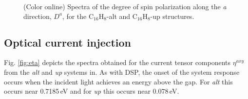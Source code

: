 \documentclass[pss]{wiley2sp} %
\begin{document}
\begin{figure}[t]
\hfill
{}
\caption{(Color online) Spectra of the degree of spin polarization along the
\emph{a} direction, {$D^{a}$}, for the C$_{16}$H$_{8}$-alt and
C$_{16}$H$_{8}$-up structures.\label{fig:Da}}
\end{figure}


\subsection{Optical current injection}

Fig. \ref{fig:eta} depicts the spectra obtained for the current tensor components $\eta^{axy}$ from the \emph{alt} and \emph{up} systems in. As with DSP, the onset of the system response occurs when the incident light achieves an energy above the gap. For \emph{alt} this occurs near 0.7185\,eV and for \emph{up} this occurs near 0.078\,eV.
\end{document}
